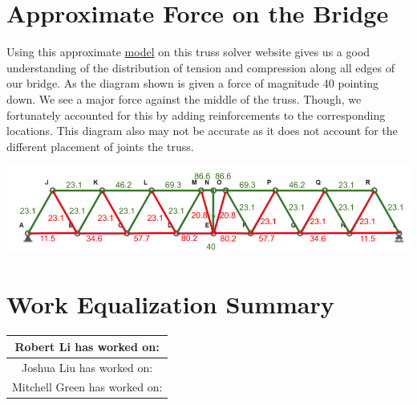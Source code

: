 \documentclass[paper=a4, fontsize=11pt]{scrartcl}
\numberwithin{equation}{section}		%
\numberwithin{figure}{section}			%
\numberwithin{table}{section}				%
\begin{document}
\section{Approximate Force on the Bridge}
Using this approximate \href{http://engsci.stevenhe.com/trusssolver2?d=N4Ig7glgJgLgFiAXCAjABgyANCAVgewgDsYBnJAbQoGY0BWLaugNgF0sKAWADgE4A6agCYMosRgZM2HZgHZq-Zp3HiUjFuwrc6s-r2YqxQ9dIq99-EYdHGpmlCmqd%2BnTifvUU3frObuOKHRoCmjc-hQozNy61OZx8XHhsbqRWCgW1LKc6bI6rnRCQrKadNwoLmHpzIJZOXmcBUWavnT83NY2aRm1vLlZDYXFHLxB-ChW1mpVNdm99Y1DZhYT1sbTmZxFQvZom5btHWvds335g-aF1QYdaFPHdf0L9tloekfVGw9nTQF0I5ZudY9U4DJrsEAAWwAphCAEZQgBO5EQVDQaXsWG2HFsmmoWE4mjcdBKWFMfkWsiw3E0aN4ml46ICaTQOywdICaKxFDWKHsUxZATU1FxaS54zSvI4gOFATx4xJKAJAWlCuJvzSSoiDDJaVMqUC9nJzTSixQlOpAUpkUJoptitY4IANvgAIZQZFURxYAC0vDRIGUIAdOFIAFcAA7h-AIsiUCj%2B8NBjhhEAIoOsAC%2BQA}{model} on this truss solver website gives us a good understanding of the distribution of tension and compression along all edges of our bridge. As the diagram shown is given a force of magnitude 40 pointing down. We see a major force against the middle of the truss. Though, we fortunately accounted for this by adding reinforcements to the corresponding locations. This diagram also may not be accurate as it does not account for the different placement of joints the truss.
\begin{center}
    \includegraphics[scale=0.5]{ForceModel}
\end{center}

\section{Work Equalization Summary}
\large
\begin{center}
    \begin{tabular}{ |c|@{\hspace{20em}}| } 
        \hline
        Robert Li has worked on:\\
        \hline
        Joshua Liu has worked on:\\
        \hline
        Mitchell Green has worked on:\\
        \hline
    \end{tabular}
\end{center}
\normalsize

\nocite{*}


\end{document}

